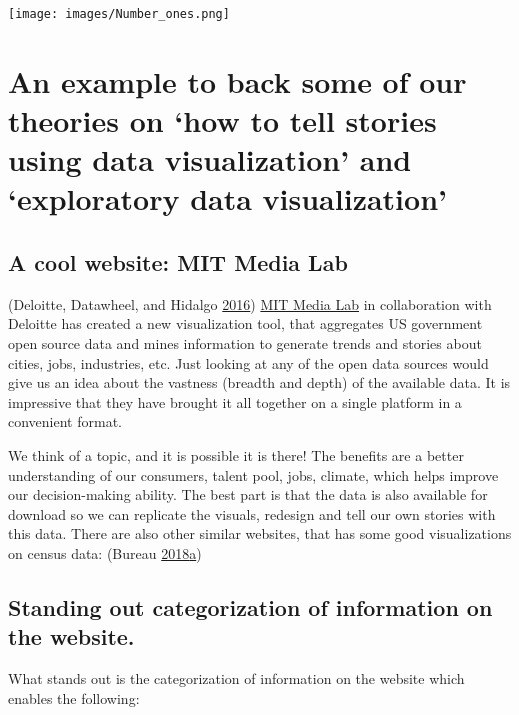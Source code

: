 \documentclass[]{book}
\begin{document}
\texttt{[image: images/Number\_ones.png]}

\hypertarget{an-example-to-back-some-of-our-theories-on-how-to-tell-stories-using-data-visualization-and-exploratory-data-visualization}{%
\section{An example to back some of our theories on `how to tell stories using data visualization' and `exploratory data visualization'}\label{an-example-to-back-some-of-our-theories-on-how-to-tell-stories-using-data-visualization-and-exploratory-data-visualization}}

\hypertarget{a-cool-website-mit-media-lab}{%
\subsection{A cool website: MIT Media Lab}\label{a-cool-website-mit-media-lab}}

(Deloitte, Datawheel, and Hidalgo \protect\hyperlink{ref-DataUSA}{2016})
\href{https://www.media.mit.edu}{MIT Media Lab} in collaboration with Deloitte has created a new visualization tool, that aggregates US government open source data and mines information to generate trends and stories about cities, jobs, industries, etc.
Just looking at any of the open data sources would give us an idea about the vastness (breadth and depth) of the available data. It is impressive that they have brought it all together on a single platform in a convenient format.

We think of a topic, and it is possible it is there! The benefits are a better understanding of our consumers, talent pool, jobs, climate, which helps improve our decision-making ability. The best part is that the data is also available for download so we can replicate the visuals, redesign and tell our own stories with this data.
There are also other similar websites, that has some good visualizations on census data: (Bureau \protect\hyperlink{ref-CensusDataViz}{2018}\protect\hyperlink{ref-CensusDataViz}{a})

\hypertarget{standing-out-categorization-of-information-on-the-website.}{%
\subsection{Standing out categorization of information on the website.}\label{standing-out-categorization-of-information-on-the-website.}}

What stands out is the categorization of information on the website which enables the following:
\end{document}
